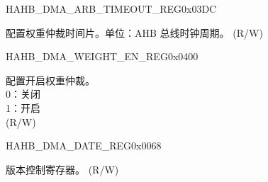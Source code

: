 \begin{register}{H}{AHB\_DMA\_ARB\_TIMEOUT\_REG}{0x03DC}\label{regdesc:AHBDMAARBTIMEOUTREG}
%
%
\regnewline%
\begin{regdesc}\begin{reglist}
\label{fielddesc:AHBDMAARBTIMEOUT}\item [AHB\_DMA\_ARB\_TIMEOUT] 配置权重仲裁时间片。单位：AHB 总线时钟周期。 (R/W)
\end{reglist}\end{regdesc}
\end{register}


\begin{register}{H}{AHB\_DMA\_WEIGHT\_EN\_REG}{0x0400}\label{regdesc:AHBDMAWEIGHTENREG}
%
%
\regnewline%
\begin{regdesc}\begin{reglist}
\label{fielddesc:AHBDMAWEIGHTEN}\item [AHB\_DMA\_WEIGHT\_EN] 配置开启权重仲裁。\\
0：关闭\\
1：开启\\ (R/W)
\end{reglist}\end{regdesc}
\end{register}


\begin{register}{H}{AHB\_DMA\_DATE\_REG}{0x0068}\label{regdesc:AHBDMADATEREG}
%
\regnewline%
\begin{regdesc}\begin{reglist}
\label{fielddesc:AHBDMADATE}\item [AHB\_DMA\_DATE] 版本控制寄存器。 (R/W)
\end{reglist}\end{regdesc}
\end{register}


